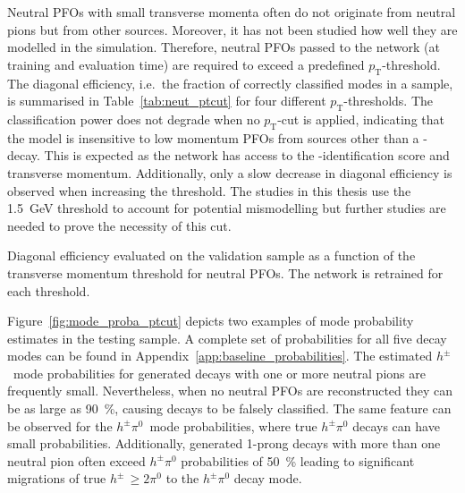 Neutral PFOs with small transverse momenta often do not originate from neutral
pions but from other sources. Moreover, it has not been studied how well they
are modelled in the simulation. Therefore, neutral PFOs passed to the network
(at training and evaluation time) are required to exceed a predefined
$p_\text{T}$-threshold. The diagonal efficiency, i.e.\ the fraction of correctly
classified modes in a sample, is summarised in Table~\ref{tab:neut_ptcut} for
four different $p_\text{T}$-thresholds. The classification power does not
degrade when no $p_\text{T}$-cut is applied, indicating that the model is
insensitive to low momentum PFOs from sources other than a
-decay. This is expected as the network has access to the
-identification score and transverse momentum. Additionally, only
a slow decrease in diagonal efficiency is observed when increasing the
threshold. The studies in this thesis use the \SI{1.5}{\giga\electronvolt}
threshold to account for potential mismodelling but further studies are needed
to prove the necessity of this cut.

\begin{table}[htb]
  \centering
  {\small}
  \caption{Diagonal efficiency evaluated on the validation sample as a function
    of the transverse momentum threshold for neutral PFOs. The network is
    retrained for each threshold.}
  \label{tab:neut_ptcut}
\end{table}

Figure~\ref{fig:mode_proba_ptcut} depicts two examples of mode probability
estimates in the testing sample. A complete set of probabilities for all five
decay modes can be found in Appendix~\ref{app:baseline_probabilities}. The
estimated $h^\pm$~mode probabilities for generated decays with one or more
neutral pions are frequently small. Nevertheless, when no neutral PFOs are
reconstructed they can be as large as \SI{90}{\percent}, causing decays to be
falsely classified. The same feature can be observed for the $h^\pm \pi^0$~mode
probabilities, where true $h^\pm \pi^0$ decays can have small probabilities.
Additionally, generated 1-prong decays with more than one neutral pion often
exceed $h^\pm \pi^0$ probabilities of \SI{50}{\percent} leading to significant
migrations of true $h^\pm \, {\geq} 2 \pi^0$ to the $h^\pm \pi^0$ decay mode.

